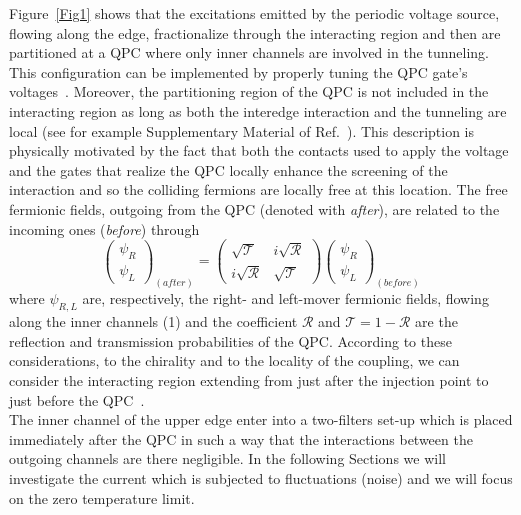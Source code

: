 \documentclass[12pt]{iopart}
\begin{document}
Figure~\ref{Fig1} shows that the excitations emitted by the periodic voltage source, flowing along the edge, fractionalize through the interacting region and then are partitioned at a QPC where only inner channels are involved in the tunneling. This configuration can be implemented by properly tuning the QPC gate's voltages~\cite{Bocquillon14, Wahl14, Marguerite16}. Moreover, the partitioning region of the QPC is not included in the interacting region as long as both the interedge interaction and the tunneling are local (see for example Supplementary Material of Ref.~\cite{Wahl14}). This description is physically motivated by the fact that both the contacts used to apply the voltage and the gates that realize the QPC locally enhance the screening of the interaction and so the colliding fermions are locally free at this location. The free fermionic fields, outgoing from the QPC (denoted with \textit{after}), are related to the incoming ones (\textit{before}) through
\begin{equation}
\begin{pmatrix}
\psi_R \\ \psi_L
\end{pmatrix}_{(\textit{after})}
=
\begin{pmatrix}
\sqrt{\mathcal{T}} & i\sqrt{\mathcal{R}} \\
i\sqrt{\mathcal{R}} & \sqrt{\mathcal{T}}
\end{pmatrix}
\begin{pmatrix}
\psi_R \\ \psi_L
\end{pmatrix}_{(\textit{before})}
\label{qpc}
\end{equation}
where $\psi_{R,L}$ are, respectively, the right- and left-mover fermionic fields, flowing along the inner channels (1) and the coefficient $\mathcal{R}$ and $\mathcal{T}=1-\mathcal{R}$ are the reflection and transmission probabilities of the QPC. According to these considerations, to the chirality and to the locality of the coupling, we can consider the interacting region extending from just after the injection point to just before the QPC~\cite{Ferraro14, Degiovanni10, Ferraro17}.\\
The inner channel of the upper edge enter into a two-filters set-up which is placed immediately after the QPC in such a way that the interactions between the outgoing channels are there negligible. In the following Sections we will investigate the current which is subjected to fluctuations (noise) and we will focus on the zero temperature limit. 
\end{document}
